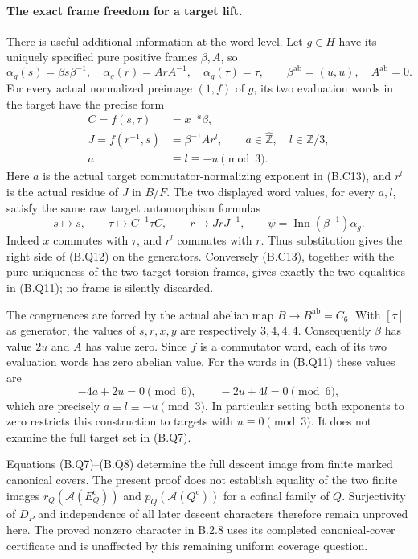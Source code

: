 \paragraph{The exact frame freedom for a target lift.}
There is useful additional information at the word level.
Let $g\in H$ have its uniquely specified pure positive
frames $\beta,A$, so
\[
 \alpha_g(s)=\beta s\beta^{-1},\quad
 \alpha_g(r)=ArA^{-1},\quad\alpha_g(\tau)=\tau,
 \qquad \beta^{\mathrm{ab}}=(u,u),\quad A^{\mathrm{ab}}=0.
\]
For every actual normalized preimage $(1,f)$ of $g$, its two
evaluation words in the target have the precise form
\[
 \begin{aligned}
 C=f(s,\tau)&=x^{-a}\beta,\\
 J=f(r^{-1},s)&=\beta^{-1}A r^l,
 \qquad a\in\widehat{\mathbb Z},\quad l\in\mathbb Z/3,\\
                 a&\equiv l\equiv -u\pmod3.
 \end{aligned}                                                  \tag{B.Q11}
\]
Here $a$ is the actual target commutator-normalizing exponent
in (B.C13), and $r^l$ is the actual residue of $J$ in $B/F$.
The two displayed word values, for every $a,l$, satisfy the
same raw target automorphism formulas
\[
 s\longmapsto s,\qquad
 \tau\longmapsto C^{-1}\tau C,\qquad
 r\longmapsto JrJ^{-1},
 \qquad \psi=\operatorname{Inn}(\beta^{-1})\alpha_g.             \tag{B.Q12}
\]
Indeed $x$ commutes with $\tau$, and $r^l$ commutes with
$r$.  Thus substitution gives the right side of (B.Q12) on
the generators.  Conversely (B.C13), together with the
pure uniqueness of the two target torsion frames, gives
exactly the two equalities in (B.Q11); no frame is silently
discarded.

The congruences are forced by the actual abelian map
$B\to B^{\mathrm{ab}}=C_6$.  With $[\tau]$ as generator,
the values of $s,r,x,y$ are respectively $3,4,4,4$.
Consequently $\beta$ has value $2u$ and $A$ has value zero.
Since $f$ is a commutator word, each of its two evaluation
words has zero abelian value.  For the words in (B.Q11)
these values are
\[
            -4a+2u=0\pmod6,\qquad
            -2u+4l=0\pmod6,
\]
which are precisely $a\equiv l\equiv-u\pmod3$.
In particular setting both exponents to zero restricts this
construction to targets with $u\equiv0\pmod3$.  It does
not examine the full target set in (B.Q7).

Equations (B.Q7)--(B.Q8) determine the full descent image
from finite marked canonical covers.  The present proof
does not establish equality of the two finite images
$r_Q(\mathcal A(E_Q^{\mathrm c}))$ and
$p_Q(\mathcal A(Q^{\mathrm c}))$ for a cofinal family of
$Q$.  Surjectivity of $D_P$ and independence of all later
descent characters therefore remain unproved here.  The
proved nonzero character in B.2.8 uses its completed
canonical-cover certificate and is unaffected by this
remaining uniform coverage question.
